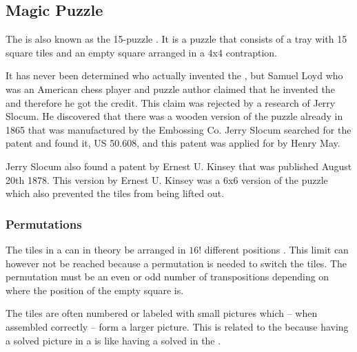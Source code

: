 \subsection{Magic Puzzle}
The \mpuzzle{} is also known as the 15-puzzle \cite[pp. 48-50]{Larsen81}. It is a puzzle that consists of a tray with 15 square tiles and an empty square arranged in a 4x4 contraption.

It has never been determined who actually invented the \mpuzzle{}, but Samuel Loyd who was an American chess player and puzzle author claimed that he invented the \mpuzzle{} and therefore he got the credit. This claim was rejected by a research of Jerry Slocum. He discovered that there was a wooden version of the puzzle already in 1865 that was manufactured by the Embossing Co. Jerry Slocum searched for the patent and found it, US 50.608, and this patent was applied for by Henry May.

Jerry Slocum also found a patent by Ernest U. Kinsey that was published August 20th 1878. This version by Ernest U. Kinsey was a 6x6 version of the puzzle which also prevented the tiles from being lifted out.

\subsubsection {Permutations}
The tiles in a \mpuzzle{} can in theory be arranged in $16!$ different positions \cite{jaapsch}. This limit can however not be reached because a permutation is needed to switch the tiles. The permutation must be an even or odd number of transpositions depending on where the position of the empty square is.

The tiles are often numbered or labeled with small pictures which -- when assembled correctly -- form a larger picture.
This is related to the \rubik{} because having a solved picture in a \mpuzzle{} is like having a solved \face{} in the \rubik{}.

